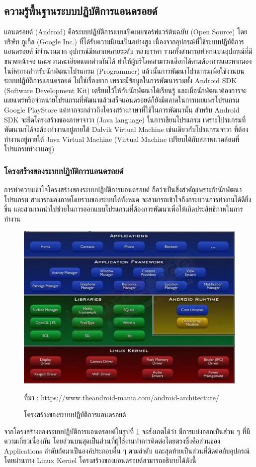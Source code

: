 
\subsection{ความรู้พื้นฐานระบบปฏิบัติการแอนดรอยด์}
แอนดรอยด์ (Android) คือระบบปฏิบัติการแบบเปิดเผยซอร์ฟแวร์ต้นฉบับ (Open Source) โดยบริษัท กูเกิ้ล (Google Inc.) ที่ได้รับความนิยมเป็นอย่างสูง เนื่องจากอุปกรณ์ที่ใช้ระบบปฏิบัติการแอนดรอยด์ มีจำนวนมาก อุปกรณ์มีหลากหลายระดับ หลายราคา รวมทั้งสามารถทำงานบนอุปกรณ์ที่มีขนาดหน้าจอ และความละเอียดแตกต่างกันได้ ทำให้ผู้บริโภคสามารถเลือกได้ตามต้องการและหากมองในทิศทางสำหรับนักพัฒนาโปรแกรม (Programmer) แล้วนั้นการพัฒนาโปรแกรมเพื่อใช้งานบนระบบปฏิบัติการแอนดรอยด์ ไม่ใช่เรื่องยาก เพราะมีข้อมูลในการพัฒนารวมทั้ง Android SDK (Software Development Kit) เตรียมไว้ให้กับนักพัฒนาได้เรียนรู้ และเมื่อนักพัฒนาต้องการจะเผยแพร่หรือจำหน่ายโปรแกรมที่พัฒนาแล้วเสร็จแอนดรอยด์ก็ยังมีตลาดในการเผยแพร่โปรแกรม Google PlayStore แต่หากจะกล่าวถึงโครงสร้างภาษาที่ใช้ในการพัฒนานั้น สำหรับ Android SDK จะยึดโครงสร้างของภาษาจาวา (Java language) ในการเขียนโปรแกรม เพราะโปรแกรมที่พัฒนามาได้จะต้องทำงานอยู่ภายใต้ Dalvik Virtual Machine เช่นเดียวกับโปรแกรมจาวา ที่ต้องทำงานอยู่ภายใต้ Java Virtual Machine (Virtual Machine เปรียบได้กับสภาพแวดล้อมที่โปรแกรมทำงานอยู่)

	\subsubsection{โครงสร้างของระบบปฏิบัติการแอนดรอยด์} 
	การทำความเข้าใจโครงสร้างของระบบปฏิบัติการแอนดรอยด์ \cite{androidbook1} ถือว่าเป็นสิ่งสำคัญเพราะถ้านักพัฒนาโปรแกรม สามารถมองภาพโดยรวมของระบบได้ทั้งหมด จะสามารถเข้าใจถึงกระบวนการทำงานได้ดียิ่งขึ้น และสามารถนำไปช่วยในการออกแบบโปรแกรมที่ต้องการพัฒนาเพื่อให้เกิดประสิทธิภาพในการทำงาน
	
	\begin{figure}[H]
		\centering
		\includegraphics[width=0.8\columnwidth]{Figures/2/androidarchitecture}
		\caption{โครงสร้างของระบบปฏิบัติการแอนดรอยด์}{ที่มา : https://www.theandroid-mania.com/android-architecture/}
		\label{Fig:androidarchitecture}
	\end{figure}
	จากโครงสร้างของระบบปฏิบัติการแอนดรอยด์ในรูปที่ \ref{Fig:androidarchitecture} จะสังเกตได้ว่า มีการแบ่งออกเป็นส่วน ๆ ที่มีความเกี่ยวเนื่องกัน โดยส่วนบนสุดเป็นส่วนที่ผู้ใช้งานทำการติดต่อโดยตรงซึ่งคือส่วนของ Applications ลำดับถัดมาเป็นองค์ประกอบอื่น ๆ ตามลำดับ และสุดท้ายเป็นส่วนที่ติดต่อกับอุปกรณ์โดยผ่านทาง Linux Kernel โครงสร้างของแอนดรอยด์สามารถอธิบายได้ดังนี้

